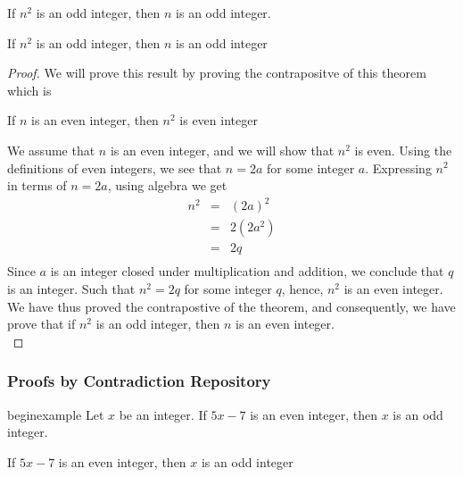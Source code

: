 \begin{example}
If $n^2$ is an odd integer, then $n$ is an odd integer. \\

\begin{tcolorbox}
	\begin{theorem}
	\label{the}		
		If $n^2$ is an odd integer, then $n$ is an odd integer
	\end{theorem}
\end{tcolorbox}

\begin{proof}
We will prove this result by proving the contrapositve of this theorem which is
	\begin{center}
		If $n$ is an even integer, then $n^2$ is even integer
	\end{center}

We assume that $n$ is an even integer, and we will show that $n^2$ is even. Using the definitions of even integers, we see that $n = 2a$ for some integer $a$. Expressing $n^2$ in terms of $n = 2a$, using algebra we get
	\begin{eqnarray*}
		n^2 & = & (2a)^2  \nonumber \\ 
		& = & 2(2a^2) \nonumber \\
		& = & 2q \nonumber \\
	\end{eqnarray*}
Since $a$ is an integer closed under multiplication and addition, we conclude that $q$ is an integer. Such that $n^2 = 2q$ for some integer $q$, hence, $n^2$ is an even integer. We have thus proved the contrapostive of the theorem, and consequently, we have prove that if $n^2$ is an odd integer, then $n$ is an even integer. \\
\end{proof}
\end{example}



\subsubsection{Proofs by Contradiction Repository}
begin{example}
Let $x$ be an integer. If $5x - 7$ is an even integer, then $x$ is an odd integer. \\

\begin{tcolorbox}
	\begin{theorem}
	\label{the}		
		If $5x - 7$ is an even integer, then $x$ is an odd integer
	\end{theorem}
\end{tcolorbox}

